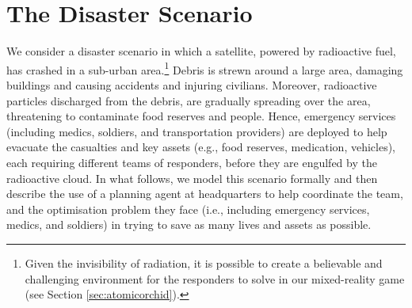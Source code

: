 \section{The Disaster Scenario}\label{sec:scenario}
\noindent We consider a disaster scenario in which a satellite, powered by radioactive fuel,  has crashed in a sub-urban area.\footnote{Given the invisibility of radiation, it is possible to create a believable and challenging environment for the responders to solve in our mixed-reality game (see Section \ref{sec:atomicorchid}).} Debris is strewn around a large area, damaging buildings and causing accidents and injuring civilians. Moreover, radioactive particles discharged from the debris, are gradually spreading over the area, threatening to contaminate food reserves and people. Hence, emergency services (including medics, soldiers, and transportation providers) are deployed to help evacuate the casualties and key assets (e.g., food reserves, medication, vehicles), each requiring different teams of responders, before they are engulfed by the radioactive cloud.  In what follows, we model this scenario formally and then describe the use of a planning agent at headquarters to help coordinate the team, and  the optimisation problem they face (i.e., including emergency services, medics, and soldiers) in trying to save as many lives and assets as possible.  


